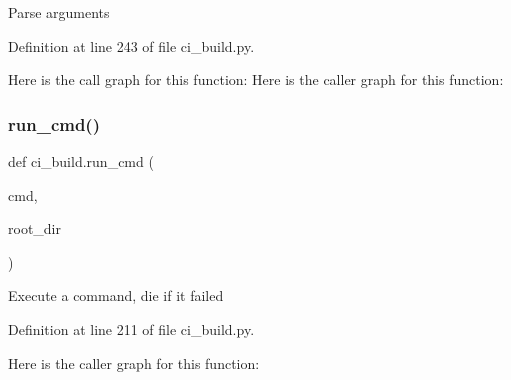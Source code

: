 \begin{DoxyVerb}Parse arguments
\end{DoxyVerb}
 

Definition at line 243 of file ci\+\_\+build.\+py.

Here is the call graph for this function\+:
Here is the caller graph for this function\+:
\mbox{\label{namespaceci__build_a40b9f44a6a3669741ef2a37fa056f19e}} 
\subsubsection{\texorpdfstring{run\+\_\+cmd()}{run\_cmd()}}
{\footnotesize\ttfamily def ci\+\_\+build.\+run\+\_\+cmd (\begin{DoxyParamCaption}\item[{}]{cmd,  }\item[{}]{root\+\_\+dir }\end{DoxyParamCaption})}

\begin{DoxyVerb}Execute a command, die if it failed
\end{DoxyVerb}
 

Definition at line 211 of file ci\+\_\+build.\+py.

Here is the caller graph for this function\+:
